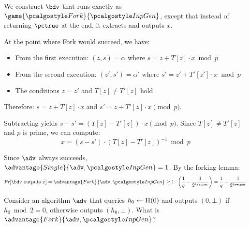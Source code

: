 \ifsolutions
\begin{mysolution}
  We construct $\bdv$ that runs exactly as $\game{\algo{Fork}}{\algo{InpGen}}$, except that instead of returning $\pctrue$ at the end, it extracts and outputs $x$.
  
  At the point where Fork would succeed, we have:
  \begin{itemize}
    \item From the first execution: $(z, s) = \alpha$ where $s = z + T[z] \cdot x \bmod p$
    \item From the second execution: $(z', s') = \alpha'$ where $s' = z' + T'[z'] \cdot x \bmod p$
    \item The conditions $z = z'$ and $T[z] \neq T'[z]$ hold
  \end{itemize}
  
  Therefore: $s = z + T[z] \cdot x$ and $s' = z + T'[z] \cdot x \pmod{p}$.
  
  Subtracting yields $s - s' = (T[z] - T'[z]) \cdot x \pmod{p}$. Since $T[z] \neq T'[z]$ and $p$ is prime, we can compute:
  \[
  x = (s - s') \cdot (T[z] - T'[z])^{-1} \bmod p
  \]
  
  Since $\adv$ always succeeds, $\advantage{Single}{\adv, \algo{InpGen}} = 1$. By the forking lemma:
  \[
  \Pr[\bdv \text{ outputs } x] = \advantage{Fork}{\adv, \algo{InpGen}} \geq 1 \cdot \left(\frac{1}{q} - \frac{1}{2^\secpar}\right) = \frac{1}{q} - \frac{1}{2^\secpar}
  \]
\end{mysolution}
\fi

\begin{exercise}
  Consider an algorithm $\adv$ that queries $h_0 \gets {\normalfont\textsc{H}}(0)$ and outputs $(0, \bot)$ if $h_0 \bmod 2 = 0$, otherwise outputs $(h_0, \bot)$. What is $\advantage{Fork}{\adv, \algo{InpGen}}$?
\end{exercise}

